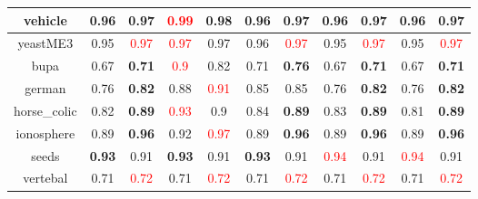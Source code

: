 \documentclass{article}%
\begin{document}
\begin{tabular}{c|cccccccccc}
\hline%
vehicle&0.96&\textbf{0.97}&\textcolor{red}{ 
0.99
}&0.98&0.96&\textbf{0.97}&0.96&\textbf{0.97}&0.96&\textbf{0.97}\\%
\hline%
yeastME3&0.95&\textcolor{red}{ 
0.97
}&\textcolor{red}{ 
0.97
}&0.97&0.96&\textcolor{red}{ 
0.97
}&0.95&\textcolor{red}{ 
0.97
}&0.95&\textcolor{red}{ 
0.97
}\\%
\hline%
bupa&0.67&\textbf{0.71}&\textcolor{red}{ 
0.9
}&0.82&0.71&\textbf{0.76}&0.67&\textbf{0.71}&0.67&\textbf{0.71}\\%
\hline%
german&0.76&\textbf{0.82}&0.88&\textcolor{red}{ 
0.91
}&0.85&0.85&0.76&\textbf{0.82}&0.76&\textbf{0.82}\\%
\hline%
horse\_colic&0.82&\textbf{0.89}&\textcolor{red}{ 
0.93
}&0.9&0.84&\textbf{0.89}&0.83&\textbf{0.89}&0.81&\textbf{0.89}\\%
\hline%
ionosphere&0.89&\textbf{0.96}&0.92&\textcolor{red}{ 
0.97
}&0.89&\textbf{0.96}&0.89&\textbf{0.96}&0.89&\textbf{0.96}\\%
\hline%
seeds&\textbf{0.93}&0.91&\textbf{0.93}&0.91&\textbf{0.93}&0.91&\textcolor{red}{ 
0.94
}&0.91&\textcolor{red}{ 
0.94
}&0.91\\%
\hline%
vertebal&0.71&\textcolor{red}{ 
0.72
}&0.71&\textcolor{red}{ 
0.72
}&0.71&\textcolor{red}{ 
0.72
}&0.71&\textcolor{red}{ 
0.72
}&0.71&\textcolor{red}{ 
0.72
}\\%
\hline%
\end{tabular}

%
\end{document}
